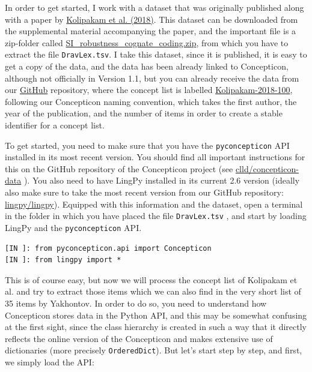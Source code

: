 \documentclass[
  a4paper,
  14pt,
  oneside,
  tablecaptionabove
]{scrbook}
\newcommand{\passthrough}[1]{#1}
\begin{document}

In order to get started, I work with a dataset that was originally
published along with a paper by
\href{http://bibliography.lingpy.org?key=Kolipakam2018}{Kolipakam et al.
(2018)}. This dataset can be downloaded from the supplemental material
accompanying the paper, and the important file is a zip-folder called
\href{http://rsos.royalsocietypublishing.org/highwire/filestream/18890/field_highwire_adjunct_files/3/rsos171504supp4.zip}{SI\_robustness\_cognate\_coding.zip},
from which you have to extract the file
\passthrough{\lstinline!DravLex.tsv!}. I take this dataset, since it is
published, it is easy to get a copy of the data, and the data has been
already linked to Concepticon, although not officially in Version 1.1,
but you can already receive the data from our
\href{https://github.com/clld/concepticon-data}{GitHub} repository,
where the concept list is labelled
\href{https://github.com/clld/concepticon-data/blob/master/concepticondata/conceptlists/Kolipakam-2018-100.tsv}{Kolipakam-2018-100},
following our Concepticon naming convention, which takes the first
author, the year of the publication, and the number of items in order to
create a stable identifier for a concept list.

To get started, you need to make sure that you have the
\lstinline!pyconcepticon! API installed in its most recent version. You
should find all important instructions for this on the GitHub repository
of the Concepticon project (see
\href{https://github.com/clld/concepticon-data}{clld/concepticon-data}
). You also need to have LingPy installed in its current 2.6 version
(ideally also make sure to take the most recent version from our GitHub
repository: \href{https://github.com/lingpy/lingpy}{lingpy/lingpy}).
Equipped with this information and the dataset, open a terminal in the
folder in which you have placed the file \lstinline!DravLex.tsv! , and
start by loading LingPy and the \lstinline!pyconcepticon! API.

\begin{lstlisting}[basicstyle=\small]
[IN ]: from pyconcepticon.api import Concepticon
[IN ]: from lingpy import *
\end{lstlisting}

This is of course easy, but now we will process the concept list of
Kolipakam et al. and try to extract those items which we can also find
in the very short list of 35 items by Yakhontov. In order to do so, you
need to understand how Concepticon stores data in the Python API, and
this may be somewhat confusing at the first sight, since the class
hierarchy is created in such a way that it directly reflects the online
version of the Concepticon and makes extensive use of dictionaries (more
precisely \lstinline!OrderedDict!). But let's start step by step, and
first, we simply load the API:
\end{document}
